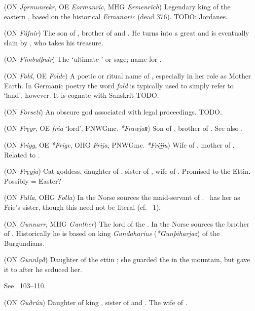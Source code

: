 \begin{itemize}
 (ON \emph{Jǫrmunrekr}, OE \emph{Eormanríc}, MHG \emph{Ermenrîch})
  Legendary king of the eastern , based on the historical \emph{Ermanaric} (dead 376).  TODO: Jordanes.

 (ON \emph{Fáfnir})
  The son of , brother of  and .  He turns into a great  and is eventually slain by , who takes his treasure.

 (ON \emph{Fimbulþulr})
  The ‘ultimate ’ or sage; name for .

 (ON \emph{Fold}, OE \emph{Folde})
  A poetic or ritual name of , especially in her role as Mother Earth.  In Germanic poetry the word \emph{fold} is typically used to simply refer to ‘land’, however.  It is cognate with Sanskrit TODO.

 (ON \emph{Forseti})
  An obscure god associated with legal proceedings. TODO.

 (ON \emph{Fręyr}, OE \emph{fréa} ‘lord’, PNWGmc. \emph{*Frawjaʀ})
  Son of , brother of . See also .

 (ON \emph{Frigg}, OE \emph{*Frige}, OHG \emph{Frija}, PNWGmc. \emph{*Frijju})
  Wife of , mother of . Related to .

 (ON \emph{Fręyja})
  Cat-goddess, daughter of , sister of , wife of . Promised to the Ettin. Possibly = Easter?

 (ON \emph{Fulla}, OHG \emph{Folla})
  In the Norse sources the maid-servant of .  \MerseburgTwo\ has her as Frie’s sister, though this need not be literal (cf. \Hyndluljod\ 1).

 (ON \emph{Gunnarr}, MHG \emph{Gunther})
  The lord of the .  In the Norse sources the brother of .  Historically he is based on king \emph{Gundaharius} (\emph{*Gunþiharjaz}) of the Burgundians.

 (ON \emph{Gunnlǫð})
  Daughter of the ettin ; she guarded the  in the mountain, but gave it to  after he seduced her.

  See \Havamal\ 103–110.

 (ON \emph{Guðrún})
  Daughter of king , sister of  and . The wife of .


\end{itemize}
